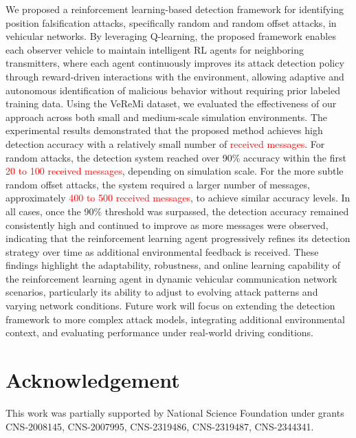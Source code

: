 \documentclass[conference]{IEEEtran}
\begin{document}
We proposed a reinforcement learning-based detection framework for identifying position falsification attacks, specifically random and random offset attacks, in vehicular networks. By leveraging Q-learning, the proposed framework enables each observer vehicle to maintain intelligent RL agents for neighboring transmitters, where each agent continuously improves its attack detection policy through reward-driven interactions with the environment, allowing adaptive and autonomous identification of malicious behavior without requiring prior labeled training data. Using the VeReMi dataset, we evaluated the effectiveness of our approach across both small and medium-scale simulation environments.
The experimental results demonstrated that the proposed method achieves high detection accuracy with a relatively small number of \textcolor{red}{received messages}. For random attacks, the detection system reached over 90\% accuracy within the first \textcolor{red}{20 to 100 received messages}, depending on simulation scale. For the more subtle random offset attacks, the system required a larger number of messages, approximately \textcolor{red}{400 to 500 received messages}, to achieve similar accuracy levels. In all cases, once the 90\% threshold was surpassed, the detection accuracy remained consistently high and continued to improve as more messages were observed, indicating that the reinforcement learning agent progressively refines its detection strategy over time as additional environmental feedback is received.
These findings highlight the adaptability, robustness, and online learning capability of the reinforcement learning agent in dynamic vehicular communication network scenarios, particularly its ability to adjust to evolving attack patterns and varying network conditions. Future work will focus on extending the detection framework to more complex attack models, integrating additional environmental context, and evaluating performance under real-world driving conditions.


\section*{Acknowledgement}

This work was partially supported by National Science Foundation under grants CNS-2008145, CNS-2007995, CNS-2319486, CNS-2319487, CNS-2344341.

%


\end{document}
